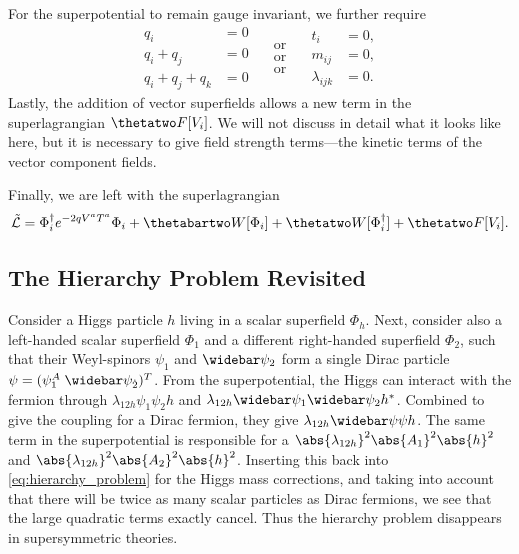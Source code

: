For the superpotential to remain gauge invariant, we further require
\begin{subequations}
\label{eq:superpotential_charge_sum}
\begin{equation}
    \begin{split}
        q_i &= 0 \\
        q_i + q_j &= 0 \\
        q_i + q_j + q_k &= 0
    \end{split}
    \begin{split}
        \quad \text{or} \quad \\
        \quad \text{or} \quad \\
        \quad \text{or} \quad
    \end{split}
    \begin{split}
         t_i &= 0, \\
         m_{ij} &= 0, \\
         \lambda_{ijk} &= 0.
    \end{split}
\end{equation}
\end{subequations}
Lastly, the addition of vector superfields allows a new term in the superlagrangian $\thetatwo F[V_i]$. We will not discuss in detail what it looks like here, but it is necessary to give field strength terms---the kinetic terms of the vector component fields.

Finally, we are left with the superlagrangian
\begin{equation}\label{eq:general_susy_lagrangian}
    \tilde{\mathcal{L}} = \Phi_i^\dagger e^{-2qV^aT^a}\Phi_i + \thetabartwo W[\Phi_i] + \thetatwo W[\Phi_i^\dagger] + \thetatwo F[V_i].
\end{equation}


\subsection{The Hierarchy Problem Revisited}
Consider a Higgs particle $h$ living in a scalar superfield $\Phi_h$. Next, consider also a left-handed scalar superfield $\Phi_1$ and a different right-handed superfield $\Phi_2$, such that their Weyl-spinors $\psi_1$ and $\widebar\psi_2$ form a single Dirac particle $\psi = (\psi_1^A \; \widebar\psi_{\dot2})^T$. From the superpotential, the Higgs can interact with the fermion through $\lambda_{12h}\psi_1\psi_2 h$ and $\lambda_{12h}\widebar\psi_1\widebar\psi_2 h^*$. Combined to give the coupling for a Dirac fermion, they give $\lambda_{12h}\widebar\psi\psi h$. The same term in the superpotential is responsible for a $\abs{\lambda_{12h}}^2 \abs{A_1}^2\abs{h}^2$ and $\abs{\lambda_{12h}}^2 \abs{A_2}^2\abs{h}^2$.
Inserting this back into \cref{eq:hierarchy_problem} for the Higgs mass corrections, and taking into account that there will be twice as many scalar particles as Dirac fermions, we see that the large quadratic terms exactly cancel.
Thus the hierarchy problem disappears in supersymmetric theories.


